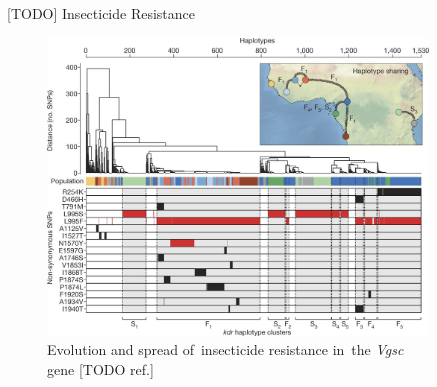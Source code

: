 \documentclass[final,hyperref={pdfpagelabels=false}]{beamer}
\begin{document}
\begin{frame}[t]
\begin{columns}[t]
\begin{column}{.465\textwidth}
\begin{block}{[TODO] Insecticide Resistance}
\begin{figure}
\includegraphics[width=.95\linewidth]{nature-mosquitoes/fig_4}
\caption{Evolution and spread of~insecticide resistance in~the \textit{Vgsc} gene [TODO ref.]}
\end{figure}

\end{block}


\end{column} %

\begin{column}{.03\textwidth}\end{column} %
 
\begin{column}{.465\textwidth} %



\end{column}
\end{columns}
\end{frame}
\end{document}
